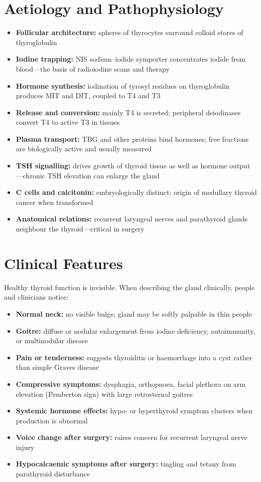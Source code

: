 \section*{Aetiology and Pathophysiology}
\begin{itemize}
    \item \textbf{Follicular architecture:} spheres of thyrocytes surround colloid stores of thyroglobulin
    \item \textbf{Iodine trapping:} NIS sodium--iodide symporter concentrates iodide from blood---the basis of radioiodine scans and therapy
    \item \textbf{Hormone synthesis:} iodination of tyrosyl residues on thyroglobulin produces MIT and DIT, coupled to T4 and T3
    \item \textbf{Release and conversion:} mainly T4 is secreted; peripheral deiodinases convert T4 to active T3 in tissues
    \item \textbf{Plasma transport:} TBG and other proteins bind hormones; free fractions are biologically active and usually measured
    \item \textbf{TSH signalling:} drives growth of thyroid tissue as well as hormone output---chronic TSH elevation can enlarge the gland
    \item \textbf{C cells and calcitonin:} embryologically distinct; origin of medullary thyroid cancer when transformed
    \item \textbf{Anatomical relations:} recurrent laryngeal nerves and parathyroid glands neighbour the thyroid---critical in surgery
\end{itemize}

\section*{Clinical Features}
Healthy thyroid function is invisible. When describing the gland clinically, people and clinicians notice:

\begin{itemize}
    \item \textbf{Normal neck:} no visible bulge; gland may be softly palpable in thin people
    \item \textbf{Goitre:} diffuse or nodular enlargement from iodine deficiency, autoimmunity, or multinodular disease
    \item \textbf{Pain or tenderness:} suggests thyroiditis or haemorrhage into a cyst rather than simple Graves disease
    \item \textbf{Compressive symptoms:} dysphagia, orthopnoea, facial plethora on arm elevation (Pemberton sign) with large retrosternal goitres
    \item \textbf{Systemic hormone effects:} hypo- or hyperthyroid symptom clusters when production is abnormal
    \item \textbf{Voice change after surgery:} raises concern for recurrent laryngeal nerve injury
    \item \textbf{Hypocalcaemic symptoms after surgery:} tingling and tetany from parathyroid disturbance
\end{itemize}

